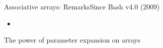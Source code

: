 \begin{frame}{Associative arrays: Remarks}{Since Bash v4.0 (2009)}
    \begin{itemize}
        \item
    \end{itemize}
\end{frame}
\begin{frame}{The power of parameter expansion on arrays}
    
\end{frame}





